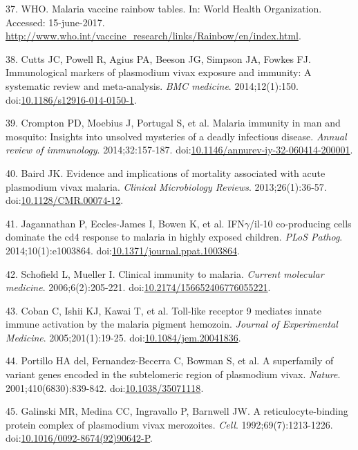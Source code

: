 \documentclass[]{article}
\begin{document}
\hypertarget{ref-rainbow2016}{}
37. WHO. Malaria vaccine rainbow tables. In: World Health Organization.
Accessed: 15-june-2017.
\url{http://www.who.int/vaccine_research/links/Rainbow/en/index.html}.

\hypertarget{ref-cutts2014meta}{}
38. Cutts JC, Powell R, Agius PA, Beeson JG, Simpson JA, Fowkes FJ.
Immunological markers of plasmodium vivax exposure and immunity: A
systematic review and meta-analysis. \emph{BMC medicine}.
2014;12(1):150.
doi:\href{https://doi.org/10.1186/s12916-014-0150-1}{10.1186/s12916-014-0150-1}.

\hypertarget{ref-crompton2014rev}{}
39. Crompton PD, Moebius J, Portugal S, et al. Malaria immunity in man
and mosquito: Insights into unsolved mysteries of a deadly infectious
disease. \emph{Annual review of immunology}. 2014;32:157-187.
doi:\href{https://doi.org/10.1146/annurev-iy-32-060414-200001}{10.1146/annurev-iy-32-060414-200001}.

\hypertarget{ref-baird2013}{}
40. Baird JK. Evidence and implications of mortality associated with
acute plasmodium vivax malaria. \emph{Clinical Microbiology Reviews}.
2013;26(1):36-57.
doi:\href{https://doi.org/10.1128/CMR.00074-12}{10.1128/CMR.00074-12}.

\hypertarget{ref-jagannathan2014}{}
41. Jagannathan P, Eccles-James I, Bowen K, et al. IFN\(\gamma\)/il-10
co-producing cells dominate the cd4 response to malaria in highly
exposed children. \emph{PLoS Pathog}. 2014;10(1):e1003864.
doi:\href{https://doi.org/10.1371/journal.ppat.1003864}{10.1371/journal.ppat.1003864}.

\hypertarget{ref-schofield2006toll}{}
42. Schofield L, Mueller I. Clinical immunity to malaria. \emph{Current
molecular medicine}. 2006;6(2):205-221.
doi:\href{https://doi.org/10.2174/156652406776055221}{10.2174/156652406776055221}.

\hypertarget{ref-coban2005toll}{}
43. Coban C, Ishii KJ, Kawai T, et al. Toll-like receptor 9 mediates
innate immune activation by the malaria pigment hemozoin. \emph{Journal
of Experimental Medicine}. 2005;201(1):19-25.
doi:\href{https://doi.org/10.1084/jem.20041836}{10.1084/jem.20041836}.

\hypertarget{ref-portillo2001vir}{}
44. Portillo HA del, Fernandez-Becerra C, Bowman S, et al. A superfamily
of variant genes encoded in the subtelomeric region of plasmodium vivax.
\emph{Nature}. 2001;410(6830):839-842.
doi:\href{https://doi.org/10.1038/35071118}{10.1038/35071118}.

\hypertarget{ref-galinski1992rbp}{}
45. Galinski MR, Medina CC, Ingravallo P, Barnwell JW. A
reticulocyte-binding protein complex of plasmodium vivax merozoites.
\emph{Cell}. 1992;69(7):1213-1226.
doi:\href{https://doi.org/10.1016/0092-8674(92)90642-P}{10.1016/0092-8674(92)90642-P}.
\end{document}
